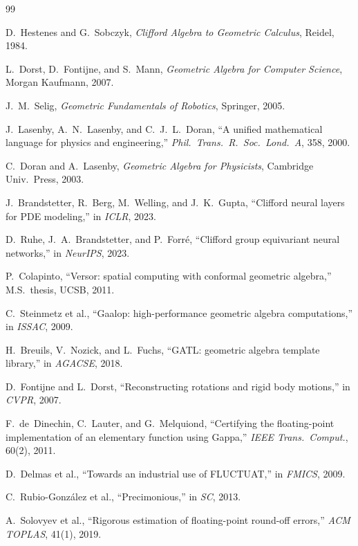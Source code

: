 \documentclass[11pt,a4paper]{article}
\theoremstyle{definition}
\theoremstyle{plain}
\theoremstyle{remark}
\begin{document}
\begin{thebibliography}{99}

D.~Hestenes and G.~Sobczyk,
\emph{Clifford Algebra to Geometric Calculus}, Reidel, 1984.

L.~Dorst, D.~Fontijne, and S.~Mann,
\emph{Geometric Algebra for Computer Science}, Morgan Kaufmann, 2007.

J.~M.~Selig,
\emph{Geometric Fundamentals of Robotics}, Springer, 2005.

J.~Lasenby, A.~N.~Lasenby, and C.~J.~L.~Doran,
``A unified mathematical language for physics and engineering,''
\emph{Phil.\ Trans.\ R.\ Soc.\ Lond.\ A}, 358, 2000.

C.~Doran and A.~Lasenby,
\emph{Geometric Algebra for Physicists}, Cambridge Univ.\ Press, 2003.

J.~Brandstetter, R.~Berg, M.~Welling, and J.~K.~Gupta,
``Clifford neural layers for PDE modeling,'' in \emph{ICLR}, 2023.

D.~Ruhe, J.~A.~Brandstetter, and P.~Forr\'{e},
``Clifford group equivariant neural networks,'' in \emph{NeurIPS}, 2023.

P.~Colapinto, ``Versor: spatial computing with conformal geometric algebra,''
M.S.\ thesis, UCSB, 2011.

C.~Steinmetz et al., ``Gaalop: high-performance geometric algebra computations,''
in \emph{ISSAC}, 2009.

H.~Breuils, V.~Nozick, and L.~Fuchs,
``GATL: geometric algebra template library,'' in \emph{AGACSE}, 2018.

D.~Fontijne and L.~Dorst,
``Reconstructing rotations and rigid body motions,'' in \emph{CVPR}, 2007.

F.~de~Dinechin, C.~Lauter, and G.~Melquiond,
``Certifying the floating-point implementation of an elementary function using Gappa,''
\emph{IEEE Trans.\ Comput.}, 60(2), 2011.

D.~Delmas et al.,
``Towards an industrial use of FLUCTUAT,'' in \emph{FMICS}, 2009.

C.~Rubio-González et al., ``Precimonious,'' in \emph{SC}, 2013.

A.~Solovyev et al.,
``Rigorous estimation of floating-point round-off errors,''
\emph{ACM TOPLAS}, 41(1), 2019.


\end{thebibliography}
\end{document}
